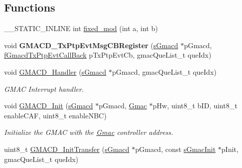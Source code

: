 \subsection*{Functions}
\begin{DoxyCompactItemize}
\item 
\+\_\+\+\_\+\+S\+T\+A\+T\+I\+C\+\_\+\+I\+N\+L\+I\+NE int \mbox{\hyperlink{group__gmacd__defines_gaf792223e30acf40b9e7a67f080f807e8}{fixed\+\_\+mod}} (int a, int b)
\item 
\mbox{\label{group__gmacd__defines_ga14397a277fce1b135fe1b2fc486c224f}} 
void {\bfseries G\+M\+A\+C\+D\+\_\+\+Tx\+Ptp\+Evt\+Msg\+C\+B\+Register} (\mbox{\hyperlink{group__gmacd__types_gaa8760917079000a5ee7fbc7fab992dd3}{s\+Gmacd}} $\ast$p\+Gmacd, \mbox{\hyperlink{group__gmacd__types_gad3329dfe65f5877f50ee8a4fd8e63f08}{f\+Gmacd\+Tx\+Ptp\+Evt\+Call\+Back}} p\+Tx\+Ptp\+Evt\+Cb, gmac\+Que\+List\+\_\+t que\+Idx)
\item 
void \mbox{\hyperlink{group__gmacd__defines_ga782194c9b7163c22016beabc6101856c}{G\+M\+A\+C\+D\+\_\+\+Handler}} (\mbox{\hyperlink{group__gmacd__types_gaa8760917079000a5ee7fbc7fab992dd3}{s\+Gmacd}} $\ast$p\+Gmacd, gmac\+Que\+List\+\_\+t que\+Idx)
\begin{DoxyCompactList}\small\item\em G\+M\+AC Interrupt handler. \end{DoxyCompactList}\item 
void \mbox{\hyperlink{group__gmacd__defines_ga8706caf686e1d073851111db1ba2663c}{G\+M\+A\+C\+D\+\_\+\+Init}} (\mbox{\hyperlink{group__gmacd__types_gaa8760917079000a5ee7fbc7fab992dd3}{s\+Gmacd}} $\ast$p\+Gmacd, \mbox{\hyperlink{structGmac}{Gmac}} $\ast$p\+Hw, uint8\+\_\+t b\+ID, uint8\+\_\+t enable\+C\+AF, uint8\+\_\+t enable\+N\+BC)
\begin{DoxyCompactList}\small\item\em Initialize the G\+M\+AC with the \mbox{\hyperlink{structGmac}{Gmac}} controller address. \end{DoxyCompactList}\item 
uint8\+\_\+t \mbox{\hyperlink{group__gmacd__defines_ga418589cbbef19de6084670d572b6ae27}{G\+M\+A\+C\+D\+\_\+\+Init\+Transfer}} (\mbox{\hyperlink{group__gmacd__types_gaa8760917079000a5ee7fbc7fab992dd3}{s\+Gmacd}} $\ast$p\+Gmacd, const \mbox{\hyperlink{group__gmacd__types_ga5ab53aef1a598e4d862677f8f1928b20}{s\+Gmac\+Init}} $\ast$p\+Init, gmac\+Que\+List\+\_\+t que\+Idx)
\item 

\end{DoxyCompactItemize}
